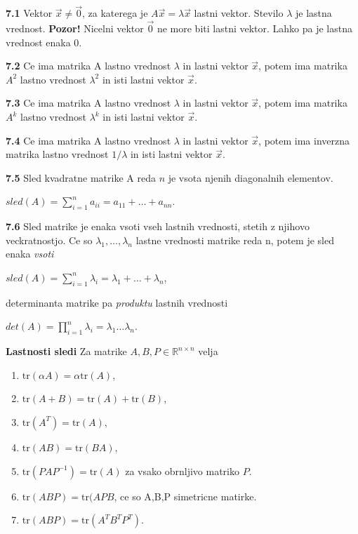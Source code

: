 \documentclass{article}
\begin{document}
\begin{multicols}{2}
	\textbf{7.1} Vektor $\vec{x} \neq \vec{0}$, za katerega je $A\vec{x} = \lambda \vec{x}$ lastni vektor. Stevilo
	$\lambda$ je lastna vrednost.
	\textbf{Pozor!} Nicelni vektor $\vec{0}$ ne more biti lastni vektor. Lahko pa je lastna vrednost enaka 0.

	\textbf{7.2} Ce ima matrika A lastno vrednost $\lambda$ in lastni vektor $\vec{x}$, potem ima matrika
	$A^{2}$ lastno vrednost $\lambda^{2}$ in isti lastni vektor $\vec{x}$.

	\textbf{7.3} Ce ima matrika A lastno vrednost $\lambda$ in lastni vektor $\vec{x}$, potem ima
	matrika $A^{k}$ lastno vrednost $\lambda^{k}$ in isti lastni vektor $\vec{x}$.

	\textbf{7.4} Ce ima matrika A lastno vrednost $\lambda$ in lastni vektor $\vec{x}$, potem ima
	inverzna matrika lastno vrednost $1 / \lambda$ in isti lastni vektor $\vec{x}$.

	\textbf{7.5} Sled kvadratne matrike A reda $n$ je vsota njenih diagonalnih elementov.
	\begin{center}
		\begin{math}
			sled(A) =
			\sum_{i=1}^{n} a_{ii} =
			a_{11} + \dots + a_{nn}
		\end{math}.
	\end{center}

	\textbf{7.6} Sled matrike je enaka vsoti vseh lastnih vrednosti, stetih z njihovo veckratnostjo.
	Ce so $\lambda_{1}, \dots, \lambda_{n}$ lastne vrednosti matrike reda n, potem je sled enaka \textit{vsoti}
	\begin{center}
		\begin{math}
			sled(A) =
			\sum_{i=1}^{n} \lambda_{i} =
			\lambda_{1} + \dots + \lambda_{n}
		\end{math},
	\end{center}
	determinanta matrike pa \textit{produktu} lastnih vrednosti
	\begin{center}
		\begin{math}
			det(A) =
			\prod_{i=1}^{n} \lambda_{i} =
			\lambda_{1} \dots  \lambda_{n}
		\end{math}.
	\end{center}

	\textbf{Lastnosti sledi} Za matrike \( A, B, P \in \mathbb{R}^{n \times n} \) velja
	\begin{enumerate}
		\item \( \text{tr}(\alpha A) = \alpha \text{tr}(A) \),
		\item \( \text{tr}(A + B) = \text{tr}(A) + \text{tr}(B) \),
		\item \( \text{tr}(A^T) = \text{tr}(A) \),
		\item \( \text{tr}(AB) = \text{tr}(BA) \),
		\item \( \text{tr}(PAP^{-1}) = \text{tr}(A) \) za vsako obrnljivo matriko \( P \).
		\item \( \text{tr}(ABP) = \text{tr}(APB\), ce so A,B,P simetricne matirke.
		\item \( \text{tr}(ABP) = \text{tr}(A^TB^TP^T)\).
	\end{enumerate}


\end{multicols}
\end{document}

